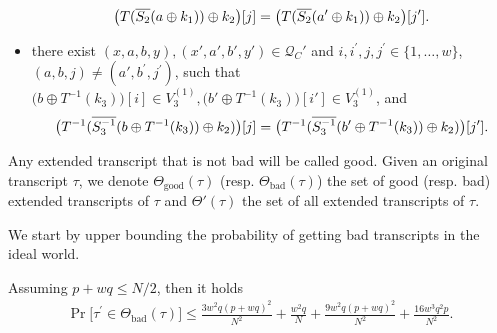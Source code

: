 \begin{definition}
\begin{itemize}[leftmargin=10mm]
		$$\big(T(\overline{S_2}(a\oplus k_1))\oplus k_2\big)[j]=\big(T(\overline{S_2}(a'\oplus k_1))\oplus k_2\big)[j'].
		$$
		\item[\bsix] there exist $(x,a,b,y),(x',a',b',y') \in \mathcal{Q}_{C}'$ and $i, i^{\prime}, j, j^{\prime} \in\{1, \ldots, w\}$, $(a,b, j) \neq \left(a',b^{\prime}, j^{\prime}\right)$, such that $\big(b \oplus T^{-1}(k_3)\big)[i]\in V_{3}^{(1)}, \big(b' \oplus T^{-1}(k_3)\big)[i']\in V_{3}^{(1)}$, and
		$$\big(T^{-1}(\overline{S_3^{-1}}(b \oplus T^{-1}(k_3))\oplus k_2)\big)[j]=\big(T^{-1}(\overline{S_3^{-1}}(b' \oplus T^{-1}(k_3))\oplus k_2)\big)[j'].
		$$
	\end{itemize}
	Any extended transcript that is not bad will be called good. Given an original transcript $\tau$, we denote $\Theta_{\mathrm{good}}(\tau)$ (resp. $\Theta_{\mathrm{bad}}(\tau)$) the set of good (resp. bad) extended transcripts of $\tau$ and $\Theta'(\tau)$ the set of all extended transcripts of $\tau$.
\end{definition}



We start by upper bounding the probability of getting bad transcripts in the ideal world.

\begin{lemma}
	\label{lemma:bad-tau-4-rounds}
	
	Assuming $p+wq\leq N/2$, then it holds
	\begin{align}
	{\Pr}\big[\tau^{\prime} \in \Theta_{\mathrm{bad}}(\tau)\big] \leq \frac{3w^{2} q \left(p+w q\right)^{2}}{N^{2}} + \frac{w^{2} q}{N} + \frac{9w^2 q (p+w q)^{2}}{N^2}+ \frac{16w^3q^2p}{N^2}.
	\label{eq:bound-bad-tau-4-rounds}
	\end{align}
\end{lemma}

